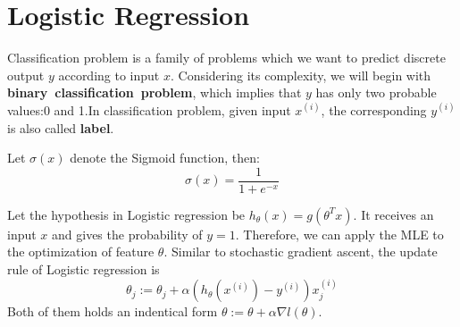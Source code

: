 \section{Logistic Regression}

Classification problem is a family of problems which we want to predict discrete output $y$ according to input $x$. Considering its complexity, we will begin with
\textbf{binary~classification~problem}, which implies that $y$ has only two probable values:0 and 1.In classification problem, given input $x^{(i)}$, the corresponding $y^{(i)}$ is also called
\textbf{label}.

\begin{define}
    Let $\sigma(x)$ denote the Sigmoid function, then:
    \[\sigma(x)=\frac{1}{1+e^{-x}}\]
\end{define}

Let the hypothesis in Logistic regression be $h_\theta(x) = g(\theta^Tx)$. It receives an input $x$ and gives the probability of $y=1$. Therefore, we can apply the MLE to the optimization of 
feature $\theta$. Similar to stochastic gradient ascent, the update rule of Logistic regression is 
\[\theta_j := \theta_j + \alpha(h_\theta(x^{(i)})-y^{(i)})x^{(i)}_j\]
Both of them holds an indentical form $\theta := \theta + \alpha\nabla l(\theta)$.
